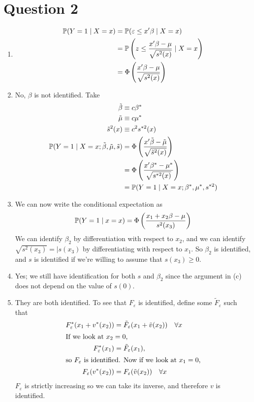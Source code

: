 \section{Question 2}
\begin{enumerate}
\item
  \begin{align*}
    \mathbb{P}(Y = 1 \mid X = x) &= \mathbb{P}(\varepsilon \le x^\prime \beta \mid X = x)\\
                         &= \mathbb{P} \left(z \le \frac{x^\prime \beta - \mu}{\sqrt{s^2(x)}} \mid X = x \right)\\
    &= \Phi \left(\frac{x^\prime \beta - \mu}{\sqrt{s^2(x)}}\right)
  \end{align*}

\item No, $\beta$ is not identified. Take
  \begin{align*}
    \tilde{\beta} &\equiv c \beta^\ast \\
    \tilde{\mu} &\equiv c \mu^\ast \\
    \tilde{s}^2(x) &\equiv c^2 s^{\ast 2}(x)\\
    \mathbb{P}(Y = 1 \mid X = x; \tilde{\beta}, \tilde{\mu}, \tilde{s}) &= \Phi \left(\frac{x^\prime \tilde{\beta} - \tilde{\mu}}{\sqrt{\tilde{s}^2(x)}}\right)\\
                  &= \Phi \left(\frac{x^\prime \beta^\ast - \mu^\ast}{\sqrt{s^{\ast 2}(x)}}\right)\\
    &= \mathbb{P} (Y = 1 \mid X = x; \beta^\ast, \mu^\ast, s^{\ast 2})
  \end{align*}
\item We can now write the conditional expectation as
  \[
\mathbb{P}(Y = 1 \mid x = x) = \Phi \left(\frac{x_1 + x_2 \beta - \mu}{s^2(x_3)}\right)
\]
We can identify $\beta_2$ by differentiation with respect to $x_2$, and we can identify $\sqrt{s^2(x_3)} = |s(x_3)$ by differentiating with respect to $x_1$. So $\beta_2$ is identified, and $s$ is identified if we're willing to assume that $s(x_3) \ge 0$.

\item Yes; we still have identification for both $s$ and $\beta_2$ since the argument in (c) does not depend on the value of $s(0)$.

\item They are both identified. To see that $F_\varepsilon$ is identified, define some $\tilde{F}_\varepsilon$ such that
  \begin{align*}
    F_\varepsilon^\ast (x_1 + v^\ast (x_2)) &= \tilde{F}_\varepsilon (x_1 + \tilde{v}(x_2))\quad \forall x\\
    \intertext{If we look at $x_2 = 0$, }
    F_\varepsilon^\ast (x_1) &= \tilde{F}_\varepsilon (x_1),\\
    \intertext{so $F_\varepsilon$ is identified. Now if we look at $x_1 = 0$,}
    F_\varepsilon (v^\ast(x_2)) &= F_\varepsilon(\tilde{v}(x_2)) \quad \forall x
  \end{align*}
  $F_\varepsilon$ is strictly increasing so we can take its inverse, and therefore $v$ is identified.


\end{enumerate}
